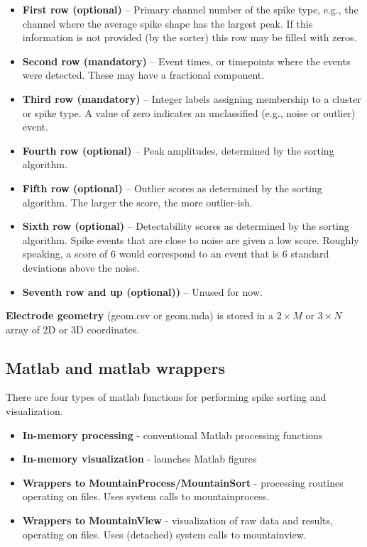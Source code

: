 \documentclass{article}
\begin{document}
\begin{itemize}
\item{\textbf{First row (optional)} -- Primary channel number of the spike type, e.g., the channel where the average spike shape has the largest peak. If this information is not provided (by the sorter) this row may be filled with zeros.}
\item{\textbf{Second row (mandatory)} -- Event times, or timepoints where the events were detected. These may have a fractional component.}
\item{\textbf{Third row (mandatory)} -- Integer labels assigning membership to a cluster or spike type. A value of zero indicates an unclassified (e.g., noise or outlier) event.}
\item{\textbf{Fourth row (optional)} -- Peak amplitudes, determined by the sorting algorithm.}
\item{\textbf{Fifth row (optional)} -- Outlier scores as determined by the sorting algorithm. The larger the score, the more outlier-ish.}
\item{\textbf{Sixth row (optional)} -- Detectability scores as determined by the sorting algorithm. Spike events that are close to noise are given a low score. Roughly speaking, a score of $6$ would correspond to an event that is $6$ standard deviations above the noise.}
\item{\textbf{Seventh row and up (optional))} -- Unused for now.}
\end{itemize}

\textbf{Electrode geometry} (geom.csv or geom.mda) is stored in a $2\times M$ or $3\times N$ array of 2D or 3D coordinates.

\subsection{Matlab and matlab wrappers}

There are four types of matlab functions for performing spike sorting and visualization.

\begin{itemize}
\item{\textbf{In-memory processing} - conventional Matlab processing functions}
\item{\textbf{In-memory visualization} - launches Matlab figures}
\item{\textbf{Wrappers to MountainProcess/MountainSort} - processing routines 
operating on files. Uses system calls to mountainprocess.}
\item{\textbf{Wrappers to MountainView} - visualization of raw data and results, operating on files. Uses (detached) system calls to mountainview.}
\end{itemize}
\end{document}

